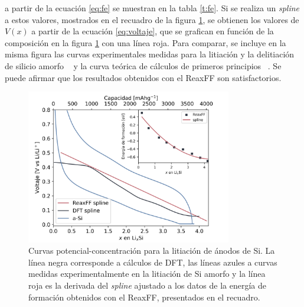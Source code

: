 a partir de la ecuación \ref{eq:fe} se muestran en la tabla \ref{t:fe}. 
Si se realiza un \textit{spline} a estos valores, mostrados en el recuadro de la
figura \ref{fig:voltaje}, se obtienen los valores de $V(x)$ a partir de la ecuación
\ref{eq:voltaje}, que se grafican en función de la composición en la figura 
\ref{fig:voltaje} con una línea roja. Para comparar, se incluye en la misma figura
las curvas experimentales medidas para la litiación y la delitiación de silicio
amorfo ~\cite{hatchard2004} y la curva teórica de cálculos de primeros principios 
~\cite{chevrier2009}. Se puede afirmar que los resultados obtenidos con el ReaxFF 
son satisfactorios.
\begin{figure}[th]
    \centering
    \includegraphics[width=0.8\textwidth]{Silicio/caracterizacion/resultados/electroquimica/voltaje.png}
    \caption{Curvas potencial-concentración para la litiación de ánodos de Si.
    La línea negra corresponde a cálculos de DFT, las líneas azules a 
    curvas medidas experimentalmente en la litiación de Si amorfo y la línea 
    roja es la derivada del \textit{spline} ajustado a los datos de la energía 
    de formación obtenidos con el ReaxFF, presentados en el recuadro.}
    \label{fig:voltaje}
\end{figure}
